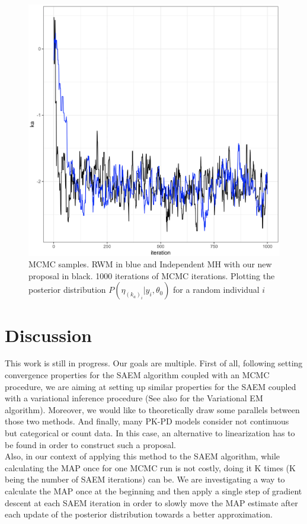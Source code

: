 \documentclass{article}
\begin{document}
\begin{figure}[ht]
\vskip 0.2in
\begin{center}
\centerline{\includegraphics[width=\columnwidth]{new_kernel.png}}
\caption{MCMC samples. RWM in blue and Independent MH with our new proposal in black. 1000 iterations of MCMC iterations. Plotting the posterior distribution $P(\eta_{(k_a)_i}|y_i,\theta_0)$ for a random individual $i$}
\label{new}
\end{center}
\vskip -0.2in
\end{figure} 

\section{Discussion} 
This work is still in progress. Our goals are multiple. First of all, following \citep{kuhn} setting convergence properties for the SAEM algorithm coupled with an MCMC procedure, we are aiming at setting up similar properties for the SAEM coupled with a variational inference procedure (See also \citep{gunawardana} for the Variational EM algorithm). Moreover, we would like to theoretically draw some parallels between those two methods. And finally, many PK-PD models consider not continuous but categorical or count data. In this case, an alternative to linearization has to be found in order to construct such a proposal.\\
Also, in our context of applying this method to the SAEM algorithm, while calculating the MAP once for one MCMC run is not costly, doing it K times (K being the number of SAEM iterations) can be. We are investigating a way to calculate the MAP once at the beginning and then apply a single step of gradient descent at each SAEM iteration in order to slowly move the MAP estimate after each update of the posterior distribution towards a better approximation.
\end{document}
